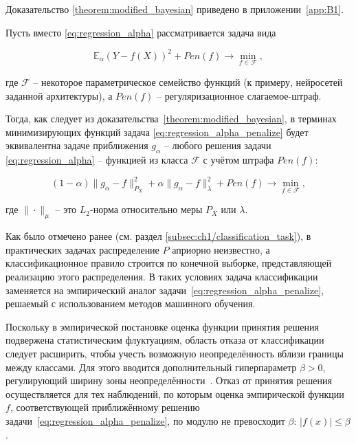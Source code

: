 
Доказательство \cref{theorem:modified_bayesian} приведено в приложении~\cref{app:B1}.

Пусть вместо \cref{eq:regression_alpha} рассматривается задача вида

\begin{equation}
    \label{eq:regression_alpha_penalize}
    \mathbb{E}_\alpha \left(Y - f(X)\right)^2 + Pen(f) \rightarrow \min\limits_{f \in \mathcal{F}},
\end{equation}

\noindent где \(\mathcal{F}\) -- некоторое параметрическое семейство функций (к примеру, нейросетей заданной архитектуры), а \(Pen(f)\) -- регуляризационное слагаемое-штраф.

Тогда, как следует из доказательства~\cref{theorem:modified_bayesian}, в терминах минимизирующих функций задача \cref{eq:regression_alpha_penalize} будет эквивалентна задаче приближения \(g_\alpha\) -- любого решения задачи \cref{eq:regression_alpha} -- функцией из класса \(\mathcal{F}\) с учётом штрафа \(Pen(f)\):

\begin{equation}
    \label{eq:approximation_penalize}
    (1 - \alpha)\|g_\alpha - f\|^2_{P_X} + \alpha \|g_\alpha - f\|^2_\lambda + Pen(f) \rightarrow \min\limits_{f \in \mathcal{F}},
\end{equation}

\noindent где \(\| \cdot \|_\mu\) -- это \(L_2\)-норма относительно меры \(P_X\) или \(\lambda\).

Как было отмечено ранее (см. раздел \cref{subsec:ch1/classification_task}), в практических задачах распределение \(P\) априорно неизвестно, а классификационное правило строится по конечной выборке, представляющей реализацию этого распределения. В таких условиях задача классификации заменяется на эмпирический аналог задачи~\cref{eq:regression_alpha_penalize}, решаемый с использованием методов машинного обучения.

Поскольку в эмпирической постановке оценка функции принятия решения подвержена статистическим флуктуациям, область отказа от классификации следует расширить, чтобы учесть возможную неопределённость вблизи границы между классами. Для этого вводится дополнительный гиперпараметр \(\beta > 0\), регулирующий ширину зоны неопределённости~\cite{mitsobi2023,mitsobi2024}. Отказ от принятия решения осуществляется для тех наблюдений, по которым оценка эмпирической функции \(f\), соответствующей приближённому решению задачи~\cref{eq:regression_alpha_penalize}, по модулю не превосходит \(\beta\): \(|f(x)| \leq \beta\).

